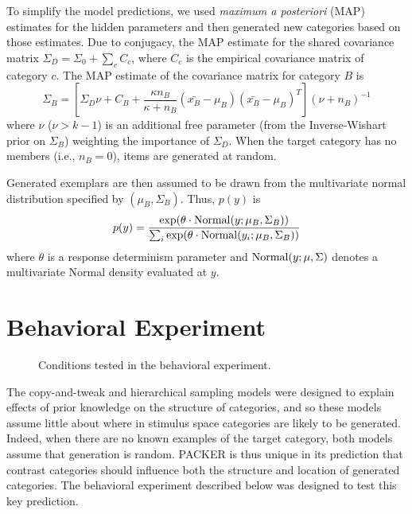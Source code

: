 \documentclass[10pt,letterpaper]{article}
\begin{document}
To simplify the model predictions, we used {\em maximum a posteriori} (MAP) estimates for the hidden parameters and then generated new categories based on those estimates. Due to conjugacy, the MAP estimate for the shared covariance matrix $\Sigma_D = \Sigma_0 + \sum_c{C_c}$, where $C_c$ is the empirical covariance matrix of category $c$. The MAP estimate of the covariance matrix for category $B$ is 
\begin{equation}
  \Sigma_B = \left[ \Sigma_D \nu + C_B +
    \dfrac
    {\kappa n_B}
    {\kappa + n_B}
    (\bar{x_B}-\mu_B)(\bar{x_B}-\mu_B)^T
  \right] (\nu + n_B)^{-1}
  \label{eq:Sigma_B}
\end{equation}
%
where $\nu$ ($\nu>k-1$) is an additional free parameter (from the Inverse-Wishart prior on $\Sigma_B$) weighting the importance of $\Sigma_{D}$. When the target category has no members (i.e., $n_B = 0$), items are generated at random.

Generated exemplars are then assumed to be drawn from the multivariate normal distribution specified by $(\mu_{B}, \Sigma_{B})$. Thus, $p(y)$ is
\begin{equation}
  p(y) = \dfrac
    {\exp( \theta \cdot {\rm Normal}(y; \mu_{B}, \Sigma_{B}))}
    {\sum_i \exp( \theta \cdot {\rm Normal}(y_i; \mu_{B}, \Sigma_{B}))} 
\end{equation}
where $\theta$ is a response determinism parameter and ${\rm Normal}(y; \mu, \Sigma)$ denotes a multivariate Normal density evaluated at $y$. 

\section{Behavioral Experiment}

\begin{figure}
    \begin{center}
    
    \caption{Conditions tested in the behavioral experiment.}
    \label{fig:middle-bottom-conditions}
    \end{center}
\end{figure}


The copy-and-tweak and hierarchical sampling models were designed to explain effects of prior knowledge on the structure of categories, and so these models assume little about where in stimulus space categories are likely to be generated. Indeed, when there are no known examples of the target category, both models assume that generation is random. PACKER is thus unique in its prediction that contrast categories should influence both the structure and location of generated categories. The behavioral experiment described below was designed to test this key prediction. 
\end{document}
